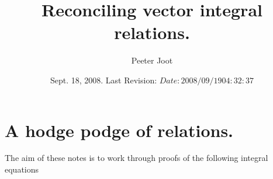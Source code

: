 \documentclass{article}
\title{ Reconciling vector integral relations. }
\author{Peeter Joot}
\date{ Sept. 18, 2008.  Last Revision: $Date: 2008/09/19 04:32:37 $ }
\begin{document}
\maketitle{}

\tableofcontents

\section{ A hodge podge of relations. }


The aim of these notes is to work through proofs of the following 
integral equations
\end{document}
